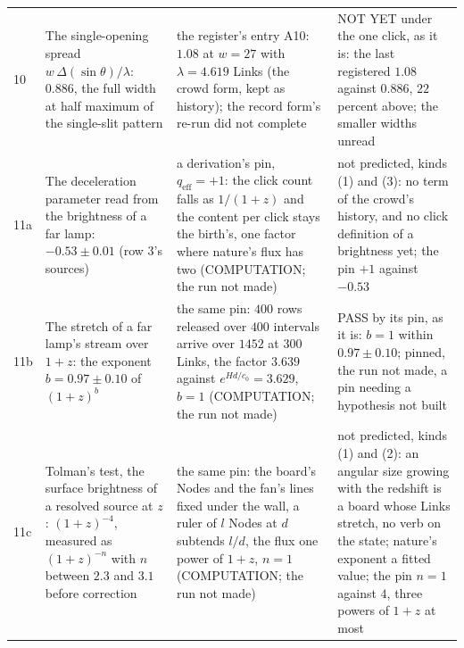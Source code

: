{\begin{longtable}{L{0.3in}L{2.0in}L{1.5in}L{2.2in}}
10 & The single-opening spread $w\,\Delta(\sin\theta)/\lambda$: $0.886$, the full width at half maximum of the single-slit pattern \cite{nairz2002} & the register's entry A10: $1.08$ at $w = 27$ with $\lambda = 4.619$ Links (the crowd form, kept as history); the record form's re-run did not complete & NOT YET under the one click, as it is: the last registered $1.08$ against $0.886$, $22$ percent above; the smaller widths unread \\
11a & The deceleration parameter read from the brightness of a far lamp: $-0.53 \pm 0.01$ (row 3's sources) & a derivation's pin, $q_{\mathrm{eff}} = +1$: the click count falls as $1/(1 + z)$ and the content per click stays the birth's, one factor where nature's flux has two (COMPUTATION; the run not made) & not predicted, kinds (1) and (3): no term of the crowd's history, and no click definition of a brightness yet; the pin $+1$ against $-0.53$ \\
11b & The stretch of a far lamp's stream over $1 + z$: the exponent $b = 0.97 \pm 0.10$ of $(1 + z)^b$ \cite{blondin2008} & the same pin: $400$ rows released over $400$ intervals arrive over $1452$ at $300$ Links, the factor $3.639$ against $e^{Hd/c_0} = 3.629$, $b = 1$ (COMPUTATION; the run not made) & PASS by its pin, as it is: $b = 1$ within $0.97 \pm 0.10$; pinned, the run not made, a pin needing a hypothesis not built \\
11c & Tolman's test, the surface brightness of a resolved source at $z$: $(1 + z)^{-4}$, measured as $(1 + z)^{-n}$ with $n$ between $2.3$ and $3.1$ before correction \cite{lubin2001} & the same pin: the board's Nodes and the fan's lines fixed under the wall, a ruler of $l$ Nodes at $d$ subtends $l/d$, the flux one power of $1 + z$, $n = 1$ (COMPUTATION; the run not made) & not predicted, kinds (1) and (2): an angular size growing with the redshift is a board whose Links stretch, no verb on the state; nature's exponent a fitted value; the pin $n = 1$ against $4$, three powers of $1 + z$ at most \\

\end{longtable}}
